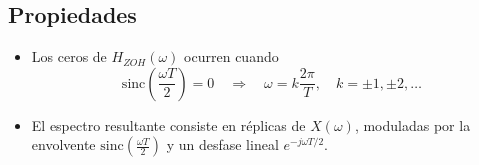 \subsection*{Propiedades}
\begin{itemize}
    \item Los ceros de $H_{ZOH}(\omega)$ ocurren cuando
    \[
    \mathrm{sinc}\!\left(\frac{\omega T}{2}\right) = 0
    \quad \Longrightarrow \quad
    \omega = k \frac{2\pi}{T}, \quad k = \pm 1, \pm 2, \dots
    \]
    \item El espectro resultante consiste en réplicas de $X(\omega)$, moduladas por la envolvente $\mathrm{sinc}\!\left(\tfrac{\omega T}{2}\right)$ y un desfase lineal $e^{-j\omega T/2}$.
\end{itemize}
